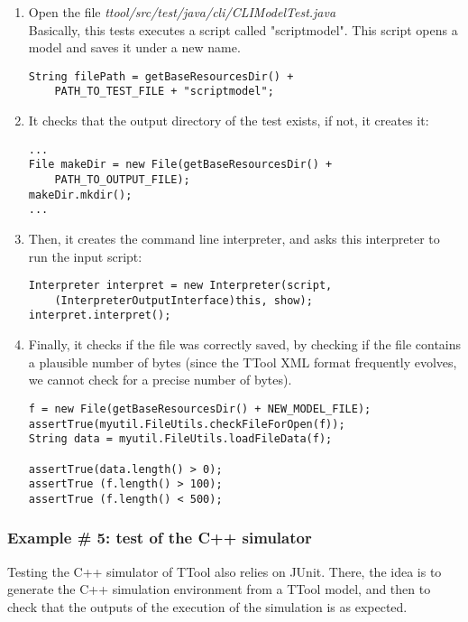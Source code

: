 \documentclass[12pt]{article}
\begin{document}
\begin{enumerate}
\item Open the file \textit{ttool/src/test/java/cli/CLIModelTest.java}\\
Basically, this tests executes a script called "scriptmodel". This script opens a model and saves it under a new name.
\begin{verbatim}
String filePath = getBaseResourcesDir() + 
    PATH_TO_TEST_FILE + "scriptmodel";
\end{verbatim}

\item It checks that the output directory of the test exists, if not, it creates it:
\begin{verbatim}
...
File makeDir = new File(getBaseResourcesDir() + 
    PATH_TO_OUTPUT_FILE);
makeDir.mkdir();
...
\end{verbatim}

\item Then, it creates the command line interpreter, and asks this interpreter to run the input script:
\begin{verbatim}
Interpreter interpret = new Interpreter(script, 
    (InterpreterOutputInterface)this, show);
interpret.interpret();
\end{verbatim}

\item Finally, it checks if the file was correctly saved, by checking if the file contains a plausible number of bytes (since the TTool XML format frequently evolves, we cannot check for a precise number of bytes).

\begin{verbatim}
f = new File(getBaseResourcesDir() + NEW_MODEL_FILE);
assertTrue(myutil.FileUtils.checkFileForOpen(f));
String data = myutil.FileUtils.loadFileData(f);

assertTrue(data.length() > 0);
assertTrue (f.length() > 100);
assertTrue (f.length() < 500);
\end{verbatim}

\end{enumerate}

\subsubsection{Example \# 5: test of the C++ simulator}
Testing  the C++ simulator of TTool also relies on JUnit. There, the idea is to generate the C++ simulation environment from a TTool model, and then to check that the outputs of the execution of the simulation is as expected.
\end{document}
